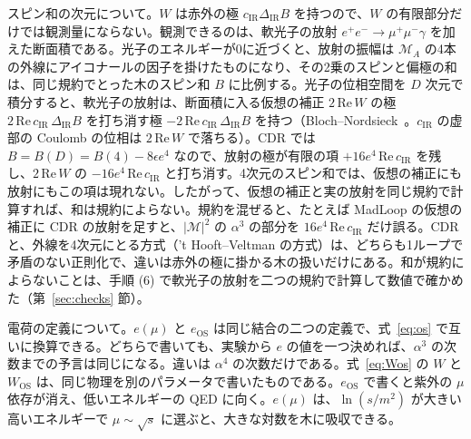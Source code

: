 \documentclass[a4paper,10pt]{ltjsarticle}
\newcommand{\DIR}{\Delta_{\mathrm{IR}}}
\begin{document}
スピン和の次元について。$W$ は赤外の極 $c_{\mathrm{IR}}\DIR B$ を持つので、$W$ の有限部分だけでは観測量にならない。観測できるのは、軟光子の放射 $e^+e^-\to\mu^+\mu^-\gamma$ を加えた断面積である。光子のエネルギーが0に近づくと、放射の振幅は $\mathcal M_A$ の4本の外線にアイコナールの因子を掛けたものになり、その2乗のスピンと偏極の和は、同じ規約でとった木のスピン和 $B$ に比例する。光子の位相空間を $D$ 次元で積分すると、軟光子の放射は、断面積に入る仮想の補正 $2\,\mathrm{Re}\,W$ の極 $2\,\mathrm{Re}\,c_{\mathrm{IR}}\,\DIR B$ を打ち消す極 $-2\,\mathrm{Re}\,c_{\mathrm{IR}}\,\DIR B$ を持つ（Bloch--Nordsieck~\cite{bn}。$c_{\mathrm{IR}}$ の虚部の Coulomb の位相は $2\,\mathrm{Re}\,W$ で落ちる）。CDR では $B=B(D)=B(4)-8\epsilon e^4$ なので、放射の極が有限の項 $+16e^4\,\mathrm{Re}\,c_{\mathrm{IR}}$ を残し、$2\,\mathrm{Re}\,W$ の $-16e^4\,\mathrm{Re}\,c_{\mathrm{IR}}$ と打ち消す。4次元のスピン和では、仮想の補正にも放射にもこの項は現れない。したがって、仮想の補正と実の放射を同じ規約で計算すれば、和は規約によらない。規約を混ぜると、たとえば MadLoop の仮想の補正に CDR の放射を足すと、$|\mathcal M|^2$ の $\alpha^3$ の部分を $16e^4\,\mathrm{Re}\,c_{\mathrm{IR}}$ だけ誤る。CDR と、外線を4次元にとる方式（'t Hooft--Veltman の方式）は、どちらも1ループで矛盾のない正則化で、違いは赤外の極に掛かる木の扱いだけにある。和が規約によらないことは、手順 (6) で軟光子の放射を二つの規約で計算して数値で確かめた（第~\ref{sec:checks} 節）。

電荷の定義について。$e(\mu)$ と $e_{\mathrm{OS}}$ は同じ結合の二つの定義で、式~\eqref{eq:os} で互いに換算できる。どちらで書いても、実験から $e$ の値を一つ決めれば、$\alpha^3$ の次数までの予言は同じになる。違いは $\alpha^4$ の次数だけである。式~\eqref{eq:Wos} の $W$ と $W_{\mathrm{OS}}$ は、同じ物理を別のパラメータで書いたものである。$e_{\mathrm{OS}}$ で書くと紫外の $\mu$ 依存が消え、低いエネルギーの QED に向く。$e(\mu)$ は、$\ln(s/m^2)$ が大きい高いエネルギーで $\mu\sim\sqrt s$ に選ぶと、大きな対数を木に吸収できる。
\end{document}
